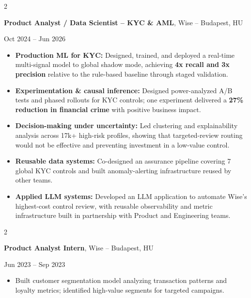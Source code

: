 \documentclass[10pt, a4paper]{article}
\newenvironment{highlights}{
    \begin{itemize}[
        topsep=0.10 cm,
        parsep=0.10 cm,
        partopsep=0pt,
        itemsep=0pt,
        leftmargin=10pt
    ]
}{
    \end{itemize}
}
\newenvironment{onecolentry}{\par}{\par}
\newenvironment{twocolentry}[2][]{
    \def\secondColumn{#2}
    \setcolumnwidth{\fill, 4.5 cm}
    \begin{paracol}{2}
}{
    \switchcolumn \raggedleft \secondColumn
    \end{paracol}
}
\begin{document}
\begin{twocolentry}{Oct 2024 -- Jun 2026}
    \textbf{Product Analyst / Data Scientist -- KYC \& AML}, Wise -- Budapest, HU
\end{twocolentry}
\begin{onecolentry}
    \begin{highlights}
        \item \textbf{Production ML for KYC:} Designed, trained, and deployed a real-time multi-signal model to global shadow mode, achieving \textbf{4x recall and 3x precision} relative to the rule-based baseline through staged validation.
        \item \textbf{Experimentation \& causal inference:} Designed power-analyzed A/B tests and phased rollouts for KYC controls; one experiment delivered a \textbf{27\% reduction in financial crime} with positive business impact.
        \item \textbf{Decision-making under uncertainty:} Led clustering and explainability analysis across 17k+ high-risk profiles, showing that targeted-review routing would not be effective and preventing investment in a low-value control.
        \item \textbf{Reusable data systems:} Co-designed an assurance pipeline covering 7 global KYC controls and built anomaly-alerting infrastructure reused by other teams.
        \item \textbf{Applied LLM systems:} Developed an LLM application to automate Wise's highest-cost control review, with reusable observability and metric infrastructure built in partnership with Product and Engineering teams.
    \end{highlights}
\end{onecolentry}

\vspace{0.1 cm}

\begin{twocolentry}{Jun 2023 -- Sep 2023}
    \textbf{Product Analyst Intern}, Wise -- Budapest, HU
\end{twocolentry}
\begin{onecolentry}
    \begin{highlights}
        \item Built customer segmentation model analyzing transaction patterns and loyalty metrics; identified high-value segments for targeted campaigns.
    \end{highlights}
\end{onecolentry}
\end{document}
